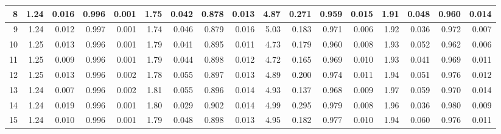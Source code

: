 \documentclass[
]{article}
\begin{document}
\begin{table}[H]
{\begin{tabular}[t]{r|r|r|r|r|r|r|r|r|r|r|r|r|r|r|r|r}
\hline
\hspace{1em}8 & 1.24 & 0.016 & 0.996 & 0.001 & 1.75 & 0.042 & 0.878 & 0.013 & 4.87 & 0.271 & 0.959 & 0.015 & 1.91 & 0.048 & 0.960 & 0.014\\
\hline
\hspace{1em}9 & 1.24 & 0.012 & 0.997 & 0.001 & 1.74 & 0.046 & 0.879 & 0.016 & 5.03 & 0.183 & 0.971 & 0.006 & 1.92 & 0.036 & 0.972 & 0.007\\
\hline
\hspace{1em}10 & 1.25 & 0.013 & 0.996 & 0.001 & 1.79 & 0.041 & 0.895 & 0.011 & 4.73 & 0.179 & 0.960 & 0.008 & 1.93 & 0.052 & 0.962 & 0.006\\
\hline
\hspace{1em}11 & 1.25 & 0.009 & 0.996 & 0.001 & 1.79 & 0.044 & 0.898 & 0.012 & 4.72 & 0.165 & 0.969 & 0.010 & 1.93 & 0.041 & 0.969 & 0.011\\
\hline
\hspace{1em}12 & 1.25 & 0.013 & 0.996 & 0.002 & 1.78 & 0.055 & 0.897 & 0.013 & 4.89 & 0.200 & 0.974 & 0.011 & 1.94 & 0.051 & 0.976 & 0.012\\
\hline
\hspace{1em}13 & 1.24 & 0.007 & 0.996 & 0.002 & 1.81 & 0.055 & 0.896 & 0.014 & 4.93 & 0.137 & 0.968 & 0.009 & 1.97 & 0.059 & 0.970 & 0.014\\
\hline
\hspace{1em}14 & 1.24 & 0.019 & 0.996 & 0.001 & 1.80 & 0.029 & 0.902 & 0.014 & 4.99 & 0.295 & 0.979 & 0.008 & 1.96 & 0.036 & 0.980 & 0.009\\
\hline
\hspace{1em}15 & 1.24 & 0.010 & 0.996 & 0.001 & 1.79 & 0.048 & 0.898 & 0.013 & 4.95 & 0.182 & 0.977 & 0.010 & 1.94 & 0.060 & 0.976 & 0.011\\
\hline
\end{tabular}}
\end{table}
\end{document}
